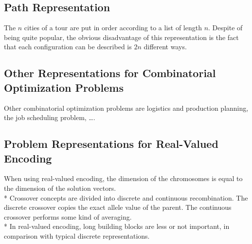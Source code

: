 \documentclass[12pt]{book}
\begin{document}
\subsection{Path Representation}
The $n$ cities of a tour are put in order according to a list of length $n$. Despite of being quite popular, the obvious disadvantage of this representation is the fact that each configuration can be described is $2n$ different ways.
\subsection{Other Representations for Combinatorial Optimization Problems}
Other combinatorial optimization problems are logistics and production planning, the job scheduling problem, \dots.
\subsection{Problem Representations for Real-Valued Encoding}
When using real-valued encoding, the dimension of the chromosomes is equal to the dimension of the solution vectors.\\*
Crossover concepts are divided into discrete and continuous recombination. The discrete crossover copies the exact allele value of the parent. The continuous crossover performs some kind of averaging.\\*
In real-valued encoding, long building blocks are less or not important, in comparison with typical discrete representations.
\end{document}
